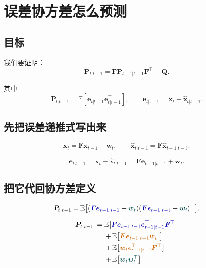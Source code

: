 \section{误差协方差怎么预测}\label{app:covariance-prediction}

\subsection{目标}

我们要证明：
\[
\bm{P}_{t|t-1}
= \bm{F}\bm{P}_{t-1|t-1}\bm{F}^\top + \bm{Q}.
\]

其中
\[
\bm{P}_{t|t-1}
= \mathbb{E}[\bm{e}_{t|t-1}\bm{e}_{t|t-1}^\top],
\qquad
\bm{e}_{t|t-1} = \bm{x}_t - \hat{\bm{x}}_{t|t-1}.
\]

\subsection{先把误差递推式写出来}


\[
\bm{x}_t = \bm{F}\bm{x}_{t-1} + \bm{w}_t,
\qquad
\hat{\bm{x}}_{t|t-1} = \bm{F}\hat{\bm{x}}_{t-1|t-1}.
\]


\[
\bm{e}_{t|t-1}
= \bm{x}_t - \hat{\bm{x}}_{t|t-1}
= \bm{F}\bm{e}_{t-1|t-1} + \bm{w}_t.
\]

\subsection{把它代回协方差定义}


\[
\bm{P}_{t|t-1}
= \mathbb{E}\big[
(\eqfocusa{\bm{F}\bm{e}_{t-1|t-1}} + \eqfocusb{\bm{w}_t})
(\eqfocusa{\bm{F}\bm{e}_{t-1|t-1}} + \eqfocusb{\bm{w}_t})^\top
\big].
\]


\[
\begin{aligned}
\bm{P}_{t|t-1}
\;=\;& \mathbb{E}\big[\eqfocusa{\bm{F}\bm{e}_{t-1|t-1}\bm{e}_{t-1|t-1}^\top\bm{F}^\top}\big] \\
&+ \mathbb{E}\big[\eqfocusc{\bm{F}\bm{e}_{t-1|t-1}\bm{w}_t^\top}\big] \\
&+ \mathbb{E}\big[\eqfocusc{\bm{w}_t\bm{e}_{t-1|t-1}^\top\bm{F}^\top}\big] \\
&+ \mathbb{E}\big[\eqfocusb{\bm{w}_t\bm{w}_t^\top}\big].
\end{aligned}
\]


